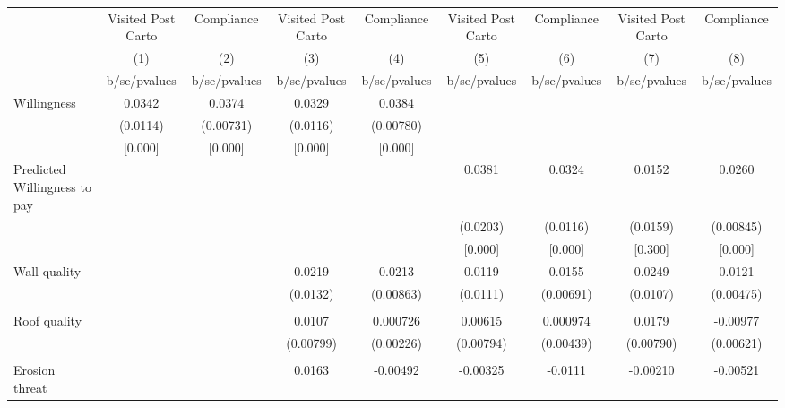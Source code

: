 {
\def\sym#1{\ifmmode^{#1}\else\(^{#1}\)\fi}
\begin{tabular}{l*{8}{c}}
\toprule
                &\multicolumn{1}{c}{Visited Post Carto}&\multicolumn{1}{c}{Compliance}&\multicolumn{1}{c}{Visited Post Carto}&\multicolumn{1}{c}{Compliance}&\multicolumn{1}{c}{Visited Post Carto}&\multicolumn{1}{c}{Compliance}&\multicolumn{1}{c}{Visited Post Carto}&\multicolumn{1}{c}{Compliance}\\
                &\multicolumn{1}{c}{(1)}&\multicolumn{1}{c}{(2)}&\multicolumn{1}{c}{(3)}&\multicolumn{1}{c}{(4)}&\multicolumn{1}{c}{(5)}&\multicolumn{1}{c}{(6)}&\multicolumn{1}{c}{(7)}&\multicolumn{1}{c}{(8)}\\
                &b/se/pvalues&b/se/pvalues&b/se/pvalues&b/se/pvalues&b/se/pvalues&b/se/pvalues&b/se/pvalues&b/se/pvalues\\
\midrule
Willingness     &   0.0342&   0.0374&   0.0329&   0.0384&         &         &         &         \\
                & (0.0114)&(0.00731)& (0.0116)&(0.00780)&         &         &         &         \\
                &  [0.000]&  [0.000]&  [0.000]&  [0.000]&         &         &         &         \\
Predicted Willingness to pay&         &         &         &         &   0.0381&   0.0324&   0.0152&   0.0260\\
                &         &         &         &         & (0.0203)& (0.0116)& (0.0159)&(0.00845)\\
                &         &         &         &         &  [0.000]&  [0.000]&  [0.300]&  [0.000]\\
Wall quality    &         &         &   0.0219&   0.0213&   0.0119&   0.0155&   0.0249&   0.0121\\
                &         &         & (0.0132)&(0.00863)& (0.0111)&(0.00691)& (0.0107)&(0.00475)\\
                &         &         &         &         &         &         &         &         \\
Roof quality    &         &         &   0.0107& 0.000726&  0.00615& 0.000974&   0.0179& -0.00977\\
                &         &         &(0.00799)&(0.00226)&(0.00794)&(0.00439)&(0.00790)&(0.00621)\\
                &         &         &         &         &         &         &         &         \\
Erosion threat  &         &         &   0.0163& -0.00492& -0.00325&  -0.0111& -0.00210& -0.00521\\

\end{tabular}}
